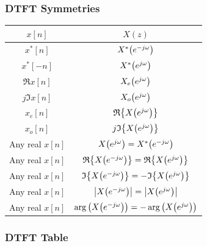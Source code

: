 \documentclass[11pt]{article}
\begin{document}
  \subsubsection{DTFT Symmetries}
  \bgroup
  \renewcommand{\arraystretch}{2}
  \setlength{\tabcolsep}{1cm}
  \large\begin{tabular}{c|c}
    \(x[n]\) & \(X(z)\)\\
    \toprule
    \(x^*[n]\) & \(X^*{\left( e^{-j\omega} \right)}\) \\
    \(x^*[-n]\) & \(X^*{\left( e^{j\omega} \right)}\) \\
    \(\Re{x[n]}\) & \(X_e{\left( e^{j\omega} \right)}\) \\
    \(j\Im{x[n]}\) & \(X_o{\left( e^{j\omega} \right)}\) \\
    \(x_e[n]\) & \(\mathfrak{R}{\left\{ X{\left( e^{j\omega} \right)} \right\}}\) \\
    \(x_o[n]\) & \(j\mathfrak{I}{\left\{ X{\left( e^{j\omega} \right)} \right\}}\) \\
    Any real \(x[n]\) & \(X{\left( e^{j\omega} \right)} = X^*{\left( e^{-j\omega} \right)}\) \\
    Any real \(x[n]\) & \(\mathfrak{R}{\left\{ X{\left( e^{-j\omega} \right)} \right\}} =
    \mathfrak{R}{\left\{ X{\left( e^{j\omega} \right)} \right\}}\) \\
    Any real \(x[n]\) & \(\mathfrak{I}{\left\{ X{\left( e^{-j\omega} \right)} \right\}} =
    -\mathfrak{I}{\left\{ X{\left( e^{j\omega} \right)} \right\}}\) \\
    Any real \(x[n]\) & \(\left|X{\left( e^{-j\omega} \right)}\right| =
    \left|X{\left( e^{j\omega} \right)}\right|\) \\
    Any real \(x[n]\) & \(\arg{\left( X{\left( e^{-j\omega} \right)} \right)} =
    -\arg{\left( X{\left( e^{j\omega} \right)} \right)}\) \\
  \end{tabular}
  \egroup

  \pagebreak

  \subsubsection{DTFT Table}
\end{document}
